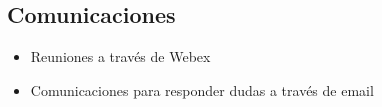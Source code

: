





\subsection{Comunicaciones}

\begin{itemize}
    \item \text{[}Reuniones a través de Webex\text{]}
    \item \text{[}Comunicaciones para responder dudas a través de email\text{]}
\end{itemize}
